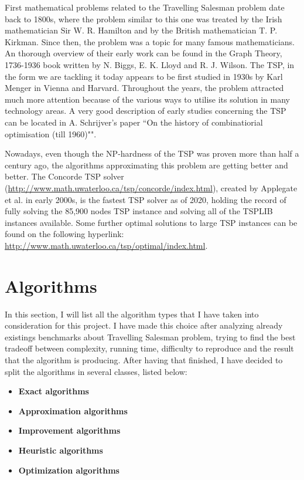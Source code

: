 \documentclass[12pt,twoside,notitlepage]{report}
\begin{document}
First mathematical problems related to the Travelling Salesman problem date back to 1800s, where the problem similar to this one was treated by the Irish mathematician Sir W. R. Hamilton and by the British mathematician T. P. Kirkman. Since then, the problem was a topic for many famous mathematicians. An thorough overview of their early work can be found in the Graph Theory, 1736-1936 book written by N. Biggs, E. K. Lloyd and R. J. Wilson. The TSP, in the form we are tackling it today appears to be first studied in 1930s by Karl Menger in Vienna and Harvard. Throughout the years, the problem attracted much more attention because of the various ways to utilise its solution in many technology areas. A very good description of early studies concerning the TSP can be located in A. Schrijver's paper ``On the history of combinatiorial optimisation (till 1960)""\cite{Schrijver_2005}.

Nowadays, even though the NP-hardness of the TSP was proven more than half a century ago, the algorithms approximating this problem are getting better and better. The Concorde TSP solver (\url{http://www.math.uwaterloo.ca/tsp/concorde/index.html}), created by Applegate et al. in early 2000s, is the fastest TSP solver as of 2020, holding the record of fully solving the 85,900 nodes TSP instance\cite{85900} and solving all of the TSPLIB instances available. Some further optimal solutions to large TSP instances can be found on the following hyperlink: \url{http://www.math.uwaterloo.ca/tsp/optimal/index.html}.
\section{Algorithms}

In this section, I will list all the algorithm types that I have taken into consideration for this project. I have made this choice after analyzing already existings benchmarks about Travelling Salesman problem, trying to find the best tradeoff between complexity, running time, difficulty to reproduce and the result that the algorithm is producing. After having that finished, I have decided to split the algorithms in several classes, listed below:

\begin{itemize}

\item {\bf Exact algorithms}
\item {\bf Approximation algorithms}
\item {\bf Improvement algorithms}
\item {\bf Heuristic algorithms}
\item {\bf Optimization algorithms} 
\end{itemize}
\end{document}
